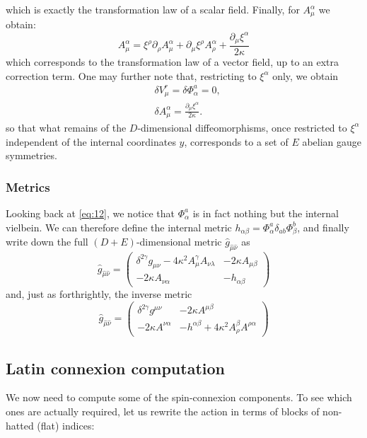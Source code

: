 \documentclass{article}
\begin{document}
which is exactly the transformation law of a scalar field. Finally, for $A^\alpha_\mu$ we obtain:
\begin{equation*}
    A^\alpha_\mu= \xi^\rho\partial_\rho A^\alpha_\mu + \partial_\mu \xi^\rho A^\alpha_\rho + \frac{\partial_\mu \xi^\alpha}{2 \kappa}
\end{equation*}
which corresponds to the transformation law of a vector field, up to an extra correction term. One may further note that, restricting to $\xi^\alpha$ only, we obtain
\begin{subequations}\label{eq:14}
\begin{align}
&\delta V^r_\mu = \delta \Phi^a_\alpha = 0,\\
&\delta A^\alpha_\mu = \frac{\partial_\mu \xi^\alpha}{2\kappa}.
\end{align}
\end{subequations}
so that what remains of the $D$-dimensional diffeomorphisms, once restricted to $\xi^\alpha$ independent of the internal coordinates $y$, corresponds to a set of $E$ abelian gauge symmetries.
\subsubsection{Metrics}
Looking back at \eqref{eq:12}, we notice that $\Phi^a_\alpha$ is in fact nothing but the internal vielbein. We can therefore define the internal metric $h_{\alpha \beta }=\Phi^a_\alpha \delta_{ab} \Phi^b_\beta$, and finally write down the full $(D+E)$-dimensional metric $\hat g_{\hat \mu \hat \nu}$ as
\begin{equation}
    \hat g_{\hat \mu \hat \nu} = \begin{pmatrix}
        \delta^{2\gamma}g_{\mu \nu} -4\kappa^2 A^{\gamma}_{\mu}A_{\nu \lambda} & -2\kappa A_{\mu \beta} \\ -2 \kappa A_{\nu \alpha} &-h_{\alpha \beta}
    \end{pmatrix}
\end{equation}
and, just as forthrightly, the inverse metric
\begin{equation}
    \hat g_{\hat \mu \hat \nu} = \begin{pmatrix}
        \delta^{2\gamma}g^{\mu \nu}  & -2\kappa A^{\mu \beta} \\ -2 \kappa A^{\nu \alpha} &-h^{\alpha \beta}+4\kappa^2 A^{\beta}_{\rho}A^{\rho \alpha}
    \end{pmatrix}
\end{equation}
\subsection{Latin connexion computation}
We now need to compute some of the spin-connexion components. To see which ones are actually required, let us rewrite the action in terms of blocks of non-hatted (flat) indices:
\end{document}
